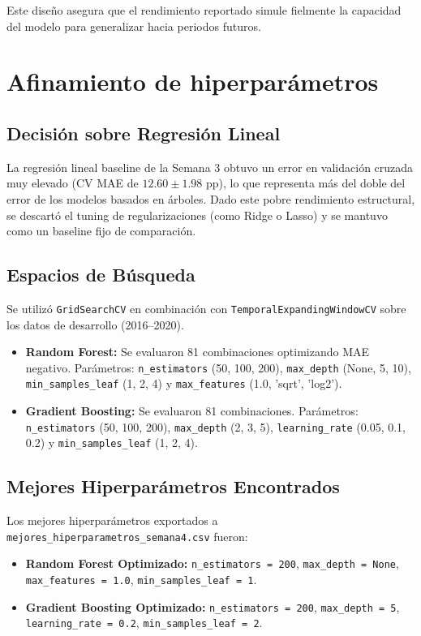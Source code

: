 \documentclass[12pt,a4paper]{article}
\begin{document}
Este diseño asegura que el rendimiento reportado simule fielmente la capacidad del modelo para generalizar hacia periodos futuros.

\section{Afinamiento de hiperparámetros}

\subsection{Decisión sobre Regresión Lineal}
La regresión lineal baseline de la Semana 3 obtuvo un error en validación cruzada muy elevado (CV MAE de $12.60 \pm 1.98$ pp), lo que representa más del doble del error de los modelos basados en árboles. Dado este pobre rendimiento estructural, se descartó el tuning de regularizaciones (como Ridge o Lasso) y se mantuvo como un baseline fijo de comparación.

\subsection{Espacios de Búsqueda}
Se utilizó \texttt{GridSearchCV} en combinación con \texttt{TemporalExpandingWindowCV} sobre los datos de desarrollo (2016--2020).
\begin{itemize}
    \item \textbf{Random Forest:} Se evaluaron 81 combinaciones optimizando MAE negativo. Parámetros: \texttt{n\_estimators} (50, 100, 200), \texttt{max\_depth} (None, 5, 10), \texttt{min\_samples\_leaf} (1, 2, 4) y \texttt{max\_features} (1.0, 'sqrt', 'log2').
    \item \textbf{Gradient Boosting:} Se evaluaron 81 combinaciones. Parámetros: \texttt{n\_estimators} (50, 100, 200), \texttt{max\_depth} (2, 3, 5), \texttt{learning\_rate} (0.05, 0.1, 0.2) y \texttt{min\_samples\_leaf} (1, 2, 4).
\end{itemize}

\subsection{Mejores Hiperparámetros Encontrados}
Los mejores hiperparámetros exportados a \texttt{mejores\_hiperparametros\_semana4.csv} fueron:
\begin{itemize}
    \item \textbf{Random Forest Optimizado:} \texttt{n\_estimators = 200}, \texttt{max\_depth = None}, \texttt{max\_features = 1.0}, \texttt{min\_samples\_leaf = 1}.
    \item \textbf{Gradient Boosting Optimizado:} \texttt{n\_estimators = 200}, \texttt{max\_depth = 5}, \texttt{learning\_rate = 0.2}, \texttt{min\_samples\_leaf = 2}.
\end{itemize}
\end{document}
